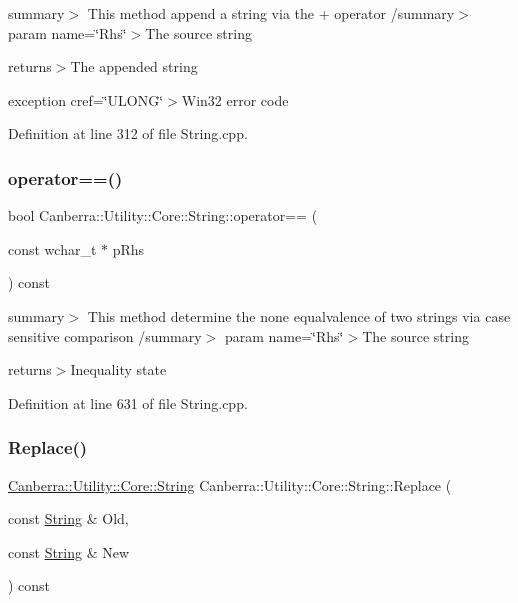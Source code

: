 summary$>$ This method append a string via the + operator /summary$>$ param name=\char`\"{}\+Rhs\char`\"{}$>$The source string

returns$>$The appended string

exception cref=\char`\"{}\+U\+L\+O\+N\+G\char`\"{}$>$Win32 error code

Definition at line 312 of file String.\+cpp.

\mbox{\label{class_canberra_1_1_utility_1_1_core_1_1_string_aafb2fb4d79d728c1ec6cd9e3f0906de2_aafb2fb4d79d728c1ec6cd9e3f0906de2}} 
\subsubsection{\texorpdfstring{operator==()}{operator==()}}
{\footnotesize\ttfamily bool Canberra\+::\+Utility\+::\+Core\+::\+String\+::operator== (\begin{DoxyParamCaption}\item[{const wchar\+\_\+t $\ast$}]{p\+Rhs }\end{DoxyParamCaption}) const}

summary$>$ This method determine the none equalvalence of two strings via case sensitive comparison /summary$>$ param name=\char`\"{}\+Rhs\char`\"{}$>$The source string

returns$>$Inequality state

Definition at line 631 of file String.\+cpp.

\mbox{\label{class_canberra_1_1_utility_1_1_core_1_1_string_a857ddfe9f2276b3a4ee060b281dc8c52_a857ddfe9f2276b3a4ee060b281dc8c52}} 
\subsubsection{\texorpdfstring{Replace()}{Replace()}}
{\footnotesize\ttfamily \hyperlink{class_canberra_1_1_utility_1_1_core_1_1_string}{Canberra\+::\+Utility\+::\+Core\+::\+String} Canberra\+::\+Utility\+::\+Core\+::\+String\+::\+Replace (\begin{DoxyParamCaption}\item[{const \hyperlink{class_canberra_1_1_utility_1_1_core_1_1_string}{String} \&}]{Old,  }\item[{const \hyperlink{class_canberra_1_1_utility_1_1_core_1_1_string}{String} \&}]{New }\end{DoxyParamCaption}) const}

